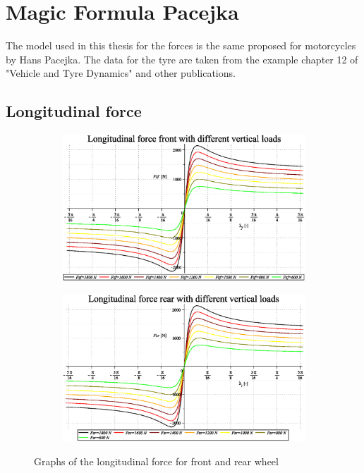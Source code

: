 \chapter{Magic Formula Pacejka}
\label{Ch:MagicFormula}
%
The model used in this thesis for the forces is the same proposed for motorcycles by Hans Pacejka.\cite{pacejka2012tire} The data for the tyre are taken from the example chapter 12 of "Vehicle and Tyre Dynamics" and other publications.\cite{sharp2004advances,sharp2014method}
%
\section{Longitudinal force}
%
\begin{figure}[hbt]
    \begin{subfigure}{.5\linewidth}
        \includegraphics[width=\linewidth]{MotoModel_tex/MotoModelplot2d1.eps}
        \caption{}
        \label{fig:long1a}
    \end{subfigure}%
    \begin{subfigure}{.5\linewidth}
        \includegraphics[width=\linewidth]{MotoModel_tex/MotoModelplot2d2.eps}
        \caption{}
        \label{fig:long1b}
    \end{subfigure}
    \caption{Graphs of the longitudinal force for front and rear wheel}
\end{figure}

